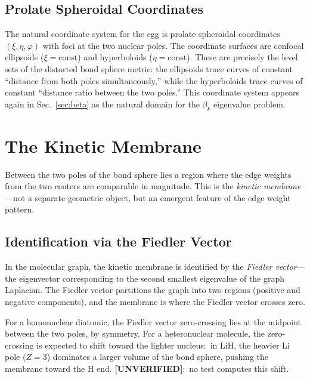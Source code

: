 \documentclass[aps,pra,twocolumn,superscriptaddress,longbibliography]{revtex4-2}
\theoremstyle{remark}
\theoremstyle{plain}
\begin{document}
\subsection{Prolate Spheroidal Coordinates}

The natural coordinate system for the egg is prolate spheroidal
coordinates $(\xi, \eta, \varphi)$ with foci at the two nuclear poles.
The coordinate surfaces are confocal ellipsoids ($\xi = \text{const}$)
and hyperboloids ($\eta = \text{const}$).  These are precisely the
level sets of the distorted bond sphere metric: the ellipsoids trace
curves of constant ``distance from both poles simultaneously,'' while
the hyperboloids trace curves of constant ``distance ratio between
the two poles.''  This coordinate system appears again in
Sec.~\ref{sec:beta} as the natural domain for the $\beta_k$ eigenvalue
problem.


\section{The Kinetic Membrane}
\label{sec:membrane}

Between the two poles of the bond sphere lies a region where the edge
weights from the two centers are comparable in magnitude.  This is the
\emph{kinetic membrane}---not a separate geometric object, but an
emergent feature of the edge weight pattern.

\subsection{Identification via the Fiedler Vector}

In the molecular graph, the kinetic membrane is identified by the
\emph{Fiedler vector}---the eigenvector corresponding to the second
smallest eigenvalue of the graph Laplacian.  The Fiedler vector
partitions the graph into two regions (positive and negative components),
and the membrane is where the Fiedler vector crosses zero.

For a homonuclear diatomic, the Fiedler vector zero-crossing lies at
the midpoint between the two poles, by symmetry.  For a heteronuclear
molecule, the zero-crossing is expected to shift toward the lighter
nucleus:\ in LiH, the heavier Li pole ($Z = 3$) dominates a larger volume
of the bond sphere, pushing the membrane toward the H end.
\textbf{[UNVERIFIED]}:\ no test computes this shift.
\end{document}

